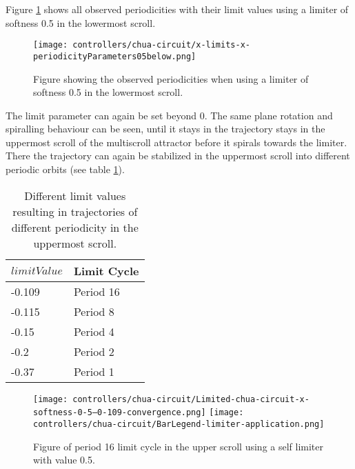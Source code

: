 \documentclass[main]{subfiles}
\begin{document}
Figure \ref{figure:x-limits-x-periodicityParameters05below} shows all observed periodicities with their limit values using a limiter of softness 0.5 in the lowermost scroll. 
\begin{figure}[H]
\centering
\texttt{[image: controllers/chua-circuit/x-limits-x-periodicityParameters05below.png]}
\caption[Figure of observed periodicities in the lowermost scroll with a self-limiting 0.5 limiter]{Figure showing the observed periodicities when using a limiter of softness 0.5 in the lowermost scroll.}
\label{figure:x-limits-x-periodicityParameters05below}
\end{figure}

The limit parameter can again be set beyond 0. The same plane rotation and spiralling behaviour can be seen, until it stays in the trajectory stays in the uppermost scroll of the multiscroll attractor before it spirals towards the limiter. %
%
There the trajectory can again be stabilized in the uppermost scroll into different periodic orbits (see table \ref{table:x-0.5-upperscroll-periodicities}).

\begin{table}[H]
\renewcommand{\arraystretch}{1.2}
\center
\begin{tabular}{@{}ll@{}}
	\toprule
   \(limitValue\) & Limit Cycle\\
   \midrule
   -0.109 & Period 16 \\
   -0.115 & Period 8 \\ 
   -0.15 & Period 4 \\
   -0.2  & Period 2 \\
   -0.37 & Period 1 \\
   \bottomrule
\end{tabular}
\caption[Limiter values for periodic trajectories for an x self-limiting limiter with softness 0.13]{Different limit values resulting in trajectories of different periodicity in the uppermost scroll.}
\label{table:x-0.5-upperscroll-periodicities}
\end{table}

\begin{figure}[H]
\centering
\texttt{[image: controllers/chua-circuit/Limited-chua-circuit-x-softness-0-5--0-109-convergence.png]}
\texttt{[image: controllers/chua-circuit/BarLegend-limiter-application.png]}
\caption[Figure of period 16 limit cycle using a 0.5 soft limiter]{Figure of period 16 limit cycle in the upper scroll using a self limiter with value 0.5.}
\label{figure:x-0.5-16-limit-cycle-upperscroll-trajectory}
\end{figure}
\end{document}
